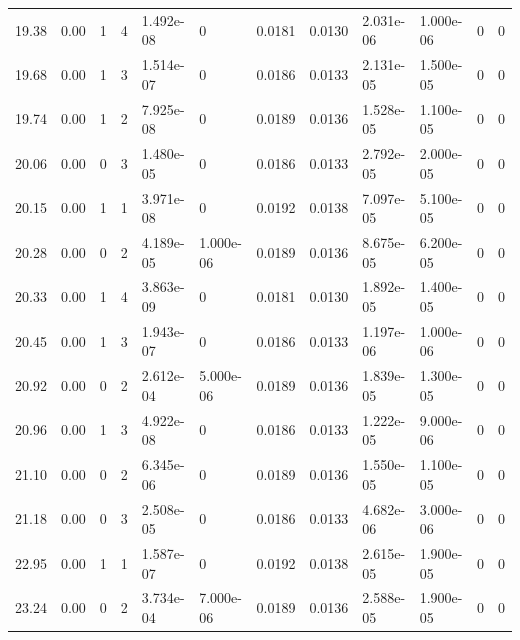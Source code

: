\documentclass[preview]{standalone}
\begin{document}
{{{\begin{tabular}{L{1.2cm}C{1.2cm} C{0.3cm}C{0.5cm} C{1.4cm}C{1.4cm} C{1.4cm}C{1.4cm} C{1.6cm}C{1.6cm} C{1.6cm}C{1.6cm}}
  19.38  &  0.00  & 1     &  4 &  1.492e-08  & 0  &  0.0181&   0.0130& 2.031e-06 & 1.000e-06   &  0 & 0  \\ 
  19.68  &  0.00  & 1     &  3 &  1.514e-07  & 0  &  0.0186&   0.0133& 2.131e-05 & 1.500e-05   &  0 & 0  \\ 
  19.74  &  0.00  & 1     &  2 &  7.925e-08  & 0  &  0.0189&   0.0136& 1.528e-05 & 1.100e-05   &  0 & 0  \\ 
  20.06  &  0.00  & 0     &  3 &  1.480e-05  & 0  &  0.0186&   0.0133& 2.792e-05 & 2.000e-05   &  0 & 0  \\ 
  20.15  &  0.00  & 1     &  1 &  3.971e-08  & 0  &  0.0192&   0.0138& 7.097e-05 & 5.100e-05   &  0 & 0  \\ 
  20.28  &  0.00  & 0     &  2 &  4.189e-05  & 1.000e-06  &  0.0189&   0.0136& 8.675e-05 & 6.200e-05   &  0 & 0  \\ 
  20.33  &  0.00  & 1     &  4 &  3.863e-09  & 0  &  0.0181&   0.0130& 1.892e-05 & 1.400e-05   &  0 & 0  \\ 
  20.45  &  0.00  & 1     &  3 &  1.943e-07  & 0  &  0.0186&   0.0133& 1.197e-06 & 1.000e-06   &  0 & 0  \\ 
  20.92  &  0.00  & 0     &  2 &  2.612e-04  & 5.000e-06  &  0.0189&   0.0136& 1.839e-05 & 1.300e-05   &  0 & 0  \\ 
  20.96  &  0.00  & 1     &  3 &  4.922e-08  & 0  &  0.0186&   0.0133& 1.222e-05 & 9.000e-06   &  0 & 0  \\ 
  21.10  &  0.00  & 0     &  2 &  6.345e-06  & 0  &  0.0189&   0.0136& 1.550e-05 & 1.100e-05   &  0 & 0  \\ 
  21.18  &  0.00  & 0     &  3 &  2.508e-05  & 0  &  0.0186&   0.0133& 4.682e-06 & 3.000e-06   &  0 & 0  \\ 
  22.95  &  0.00  & 1     &  1 &  1.587e-07  & 0  &  0.0192&   0.0138& 2.615e-05 & 1.900e-05   &  0 & 0  \\ 
  23.24  &  0.00  & 0     &  2 &  3.734e-04  & 7.000e-06  &  0.0189&   0.0136& 2.588e-05 & 1.900e-05   &  0 & 0  \\ 
\hline 
\end{tabular} 

}}}
\end{document}
